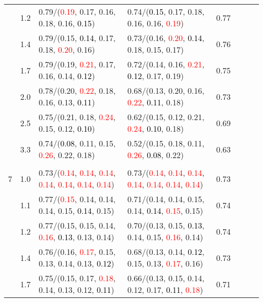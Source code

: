 \documentclass[10pt,a4paper]{report}
\begin{document}
\begin{table}[!htbp]
\begin{center}
{\begin{tabular}{ccllcccc}
			&1.2&0.79/(\textcolor{red}{0.19}, 0.17, 0.16, 0.18, 0.16, \textcolor{black}{0.15})&0.74/(\textcolor{black}{0.15}, 0.17, 0.18, 0.16, 0.16, \textcolor{red}{0.19})&0.77\\
			&1.4&0.79/(0.15, \textcolor{black}{0.14}, 0.17, 0.18, \textcolor{red}{0.20}, 0.16)&0.73/(0.16, \textcolor{red}{0.20}, \textcolor{black}{0.14}, 0.18, 0.15, 0.17)&0.76\\
			&1.7&0.79/(0.19, \textcolor{red}{0.21}, 0.17, 0.16, 0.14, \textcolor{black}{0.12})&0.72/(0.14, 0.16, \textcolor{red}{0.21}, \textcolor{black}{0.12}, 0.17, 0.19)&0.75\\
			&2.0&0.78/(0.20, \textcolor{red}{0.22}, 0.18, 0.16, 0.13, \textcolor{black}{0.11})&0.68/(0.13, 0.20, 0.16, \textcolor{red}{0.22}, \textcolor{black}{0.11}, 0.18)&0.73\\
			&2.5&0.75/(0.21, 0.18, \textcolor{red}{0.24}, 0.15, 0.12, \textcolor{black}{0.10})&0.62/(0.15, 0.12, 0.21, \textcolor{red}{0.24}, \textcolor{black}{0.10}, 0.18)&0.69\\
			&3.3&0.74/(\textcolor{black}{0.08}, 0.11, 0.15, \textcolor{red}{0.26}, 0.22, 0.18)&0.52/(0.15, 0.18, 0.11, \textcolor{red}{0.26}, \textcolor{black}{0.08}, 0.22)&0.63\\
			&&&&\\
			7			&1.0&0.73/(\textcolor{red}{0.14}, \textcolor{red}{0.14}, \textcolor{red}{0.14}, \textcolor{red}{0.14}, \textcolor{red}{0.14}, \textcolor{red}{0.14}, \textcolor{red}{0.14})&0.73/(\textcolor{red}{0.14}, \textcolor{red}{0.14}, \textcolor{red}{0.14}, \textcolor{red}{0.14}, \textcolor{red}{0.14}, \textcolor{red}{0.14}, \textcolor{red}{0.14})&0.73\\
			&1.1&0.77/(\textcolor{red}{0.15}, 0.14, 0.14, 0.14, 0.15, \textcolor{black}{0.14}, 0.15)&0.71/(0.14, 0.14, 0.15, 0.14, \textcolor{black}{0.14}, \textcolor{red}{0.15}, 0.15)&0.74\\
			&1.2&0.77/(0.15, 0.15, 0.14, \textcolor{red}{0.16}, \textcolor{black}{0.13}, 0.13, 0.14)&0.70/(0.13, 0.15, \textcolor{black}{0.13}, 0.14, 0.15, \textcolor{red}{0.16}, 0.14)&0.74\\
			&1.4&0.76/(0.16, \textcolor{red}{0.17}, 0.15, 0.13, 0.14, 0.13, \textcolor{black}{0.12})&0.68/(0.13, 0.14, \textcolor{black}{0.12}, 0.15, 0.13, \textcolor{red}{0.17}, 0.16)&0.73\\
			&1.7&0.75/(0.15, 0.17, \textcolor{red}{0.18}, 0.14, 0.13, 0.12, \textcolor{black}{0.11})&0.66/(0.13, 0.15, 0.14, 0.12, 0.17, \textcolor{black}{0.11}, \textcolor{red}{0.18})&0.71\\

\end{tabular}}
\end{center}
\end{table}
\end{document}
